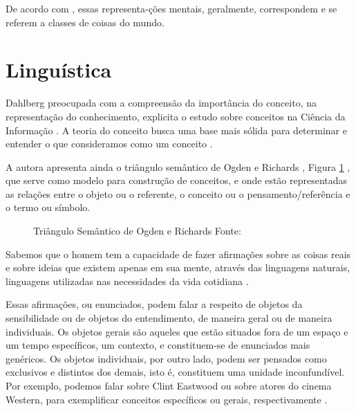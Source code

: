 
De acordo com , essas representa-ções mentais, geralmente, correspondem e se referem a classes de coisas do mundo.

\section{\hspace*{3pt} Linguística}

Dahlberg preocupada com a compreensão da importância do conceito, na representação do conhecimento, explicita o estudo sobre conceitos na Ciência da Informação \cite{nonato:2009.teoria}. A teoria do conceito busca uma base mais sólida para determinar e entender o que consideramos como um conceito \cite{campos:2001.organizacao}.

A autora apresenta ainda o triângulo semântico de Ogden e Richards \cite{ogden:1923.meaning}, Figura \ref{fig:triangulo_Richards} , que serve como modelo para construção de conceitos, e onde estão representadas as relações entre o objeto ou o referente, o conceito ou o pensamento/referência e o termo ou símbolo.

\begin{figure}
    \centering
    \caption{Triângulo Semântico de Ogden e Richards Fonte:}
    \label{fig:triangulo_Richards}
\end{figure}

Sabemos que o homem tem a capacidade de fazer afirmações sobre as coisas reais e sobre ideias que existem apenas em sua mente, através das linguagens naturais, linguagens utilizadas nas necessidades da vida cotidiana \cite{campos:2001.organizacao}. 

Essas afirmações, ou enunciados, podem falar a respeito de objetos da sensibilidade ou de objetos do entendimento, de maneira geral ou de maneira individuais. Os objetos gerais são aqueles que estão situados fora de um espaço e um tempo específicos, um contexto, e constituem-se de enunciados mais genéricos. Os objetos individuais, por outro lado, podem ser pensados como exclusivos e distintos dos demais, isto é, constituem uma unidade inconfundível. Por exemplo, podemos falar sobre Clint Eastwood ou sobre atores do cinema Western, para exemplificar conceitos específicos ou gerais, respectivamente .

